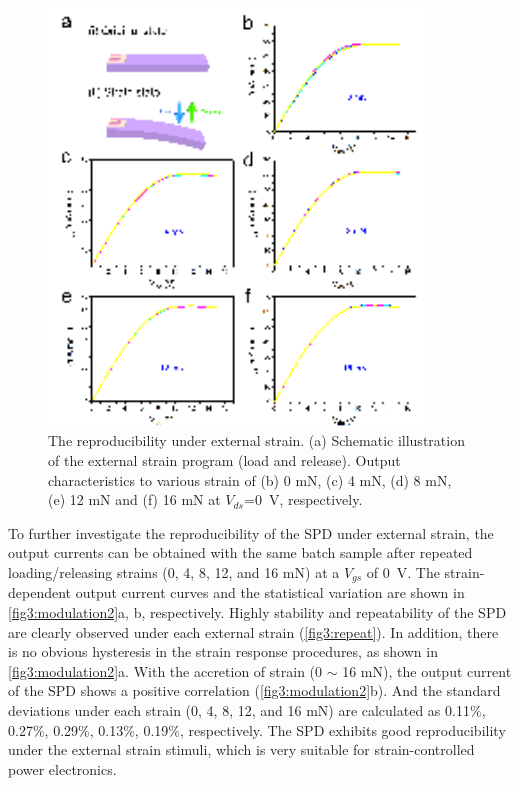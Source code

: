 \begin{figure}[H] 
\centering    
\includegraphics[width=0.9\textwidth]{ch3_repeat}
\caption[The reproducibility of the SPD under external strain]{The  reproducibility under external strain. (a) Schematic illustration of the external strain program (load and release). Output characteristics to various strain of (b) 0 \unit{\mN}, (c) 4 \unit{\mN}, (d) 8 \unit{\mN}, (e) 12 \unit{\mN} and (f) 16 \unit{\mN} at $V_{ds}$=\SI{0}{\volt}, respectively.}
\label{fig3:repeat}
\end{figure}

To further investigate the reproducibility of the SPD  under external strain, the output currents can be obtained with the same batch sample after repeated loading/releasing strains (0, 4, 8, 12, and 16 \unit{\mN}) at a $V_{gs}$ of \SI{0}{\volt}. The strain-dependent output current  curves and the statistical variation are shown in \autoref{fig3:modulation2}a, b, respectively. Highly stability and repeatability of the SPD  are clearly observed under each external strain (\autoref{fig3:repeat}). In addition, there is no obvious hysteresis in the strain response procedures, as shown in \autoref{fig3:modulation2}a. With the accretion of strain (0 $\sim$ 16 \unit{\mN}), the output current of the SPD shows a positive correlation (\autoref{fig3:modulation2}b). And the standard deviations under each strain (0, 4, 8, 12, and 16 \unit{\mN}) are calculated as 0.11$\%$, 0.27$\%$, 0.29$\%$, 0.13$\%$, 0.19$\%$, respectively. The SPD exhibits good reproducibility under  the external strain stimuli, which is very suitable for strain-controlled power electronics.

